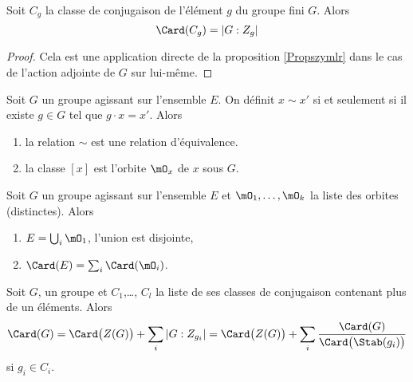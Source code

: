 \begin{corollary}
    Soit \( C_g\) la classe de conjugaison de l'élément  \( g\) du groupe fini \( G\). Alors
    \begin{equation}
        \Card(C_g)=| G:Z_g |
    \end{equation}
\end{corollary}

\begin{proof}
    Cela est une application directe de la proposition \ref{Propszymlr} dans le cas de l'action adjointe de \( G\) sur lui-même.
\end{proof}

\begin{lemma}
    Soit \( G\) un groupe agissant sur l'ensemble \( E\). On définit \( x\sim x'\) si et seulement si il existe \( g\in G\) tel que \( g\cdot x=x'\). Alors
    \begin{enumerate}
        \item
            la relation \( \sim\) est une relation d'équivalence.
        \item
            la classe \( [x]\) est l'orbite \( \mO_x\) de \( x\) sous \( G\).
    \end{enumerate}
\end{lemma}

\begin{corollary}
    Soit \( G\) un groupe agissant sur l'ensemble \( E\) et \( \mO_1,\ldots, \mO_k  \) la liste des orbites (distinctes). Alors
    \begin{enumerate}
        \item
            \( E=\bigcup_i\mO_1\), l'union est disjointe,
        \item
            \( \Card(E)=\sum_i\Card(\mO_i)\).
    \end{enumerate}
\end{corollary}

\begin{corollary}
    Soit \( G\), un groupe et \( C_1\),\ldots, \( C_l\) la liste de ses classes de conjugaison contenant plus de un éléments. Alors
    \begin{equation}        \label{EqkgGmoq}
        \Card(G)=\Card\big( Z(G) \big)+\sum_i| G:Z_{g_i} |=\Card\big( Z(G) \big)+\sum_i\frac{ \Card(G) }{ \Card\big( \Stab(g_i) \big) }
    \end{equation}
    si \( g_i\in C_i\).
\end{corollary}


